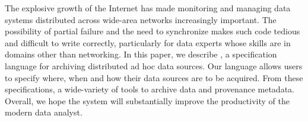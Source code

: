 The explosive growth of the Internet has made monitoring and managing
data systems distributed across wide-area networks increasingly
important.  The possibility of partial failure and the need to
synchronize makes such code tedious and difficult to write correctly,
particularly for data experts whose skills are in domains other than
networking. In this paper, we describe \padsd{}, a specification
language for archiving distributed ad hoc data sources.  Our language
allows users to specify where, when and how their data sources are
to be acquired. From these specifications,
a wide-variety of tools to archive data and provenance metadata.  
Overall, we hope the system will substantially improve the productivity of
the modern data analyst.
